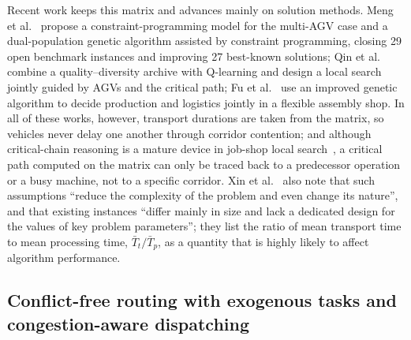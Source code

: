 Recent work keeps this matrix and advances mainly on solution methods. Meng et al.~\cite{meng2025cp} propose a constraint-programming model for the multi-AGV case and a dual-population genetic algorithm assisted by constraint programming, closing 29 open benchmark instances and improving 27 best-known solutions; Qin et al.~\cite{qin2026knowledge} combine a quality--diversity archive with Q-learning and design a local search jointly guided by AGVs and the critical path; Fu et al.~\cite{fu2025integrated} use an improved genetic algorithm to decide production and logistics jointly in a flexible assembly shop.
In all of these works, however, transport durations are taken from the matrix, so vehicles never delay one another through corridor contention; and although critical-chain reasoning is a mature device in job-shop local search~\cite{otala2021graph,tamssaouet2023neighborhood}, a critical path computed on the matrix can only be traced back to a predecessor operation or a busy machine, not to a specific corridor.
Xin et al.~\cite{xin2025review} also note that such assumptions ``reduce the complexity of the problem and even change its nature'', and that existing instances ``differ mainly in size and lack a dedicated design for the values of key problem parameters''; they list the ratio of mean transport time to mean processing time, $\bar{T}_t/\bar{T}_p$, as a quantity that is highly likely to affect algorithm performance.

\subsection{Conflict-free routing with exogenous tasks and congestion-aware dispatching}

